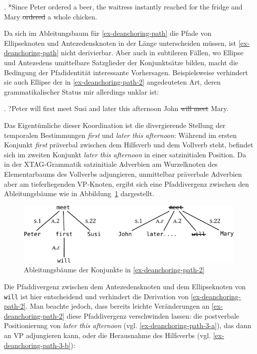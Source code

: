\ex. *Since Peter ordered a beer, the waitress instantly reached for the fridge and Mary \sout{ordered} a whole chicken. \hfill \citep[(10)]{Lichte:Kallmeyer:10}\label{ex-deanchoring-path}

Da sich im Ableitungsbaum für \ref{ex-deanchoring-path} die Pfade von Ellipseknoten und Antezedensknoten in der Länge  unterscheiden müssen, ist \ref{ex-deanchoring-path} nicht derivierbar. Aber auch in subtileren Fällen, wo Ellipse und Antezedens umittelbare Satzglieder der Konjunktsätze bilden, macht die Bedingung der Pfadidentität interessante Vorhersagen. Beispielsweise verhindert sie auch Ellipse der in \ref{ex-deanchoring-path-2} angedeuteten Art, deren grammatikalischer Status mir allerdings unklar ist:

\ex. \label{ex-deanchoring-path-2} 
?Peter will first meet Susi and later this afternoon John \sout{will meet} Mary.

Das Eigentümliche dieser Koordination ist die divergierende Stellung der temporalen Bestimmungen {\it first} und {\it later this afternoon}: Während im ersten Konjunkt {\it first} präverbal zwischen dem Hilfsverb und dem Vollverb steht, befindet sich im zweiten Konjunkt {\it later this afternoon} in einer satzinitialen Position. Da in der XTAG-Grammatik satzinitiale Adverbien am Wurzelknoten des Elementarbaums des Vollverbs adjungieren, unmittelbar präverbale Adverbien aber am tieferliegenden VP-Knoten, ergibt sich eine Pfaddivergenz zwischen den Ableitungsbäume wie in Abbildung~\ref{fig-deanchoring-path} dargestellt. 
\begin{figure}[t]
\centering
\includegraphics{graphics/abb823.pdf}
\caption{\label{fig-deanchoring-path}Ableitungsbäume der Konjunkte in \ref{ex-deanchoring-path-2}}
\end{figure}
Die Pfaddivergenz zwischen dem Antezedensknoten und dem Ellipseknoten von {\tt will} ist hier entscheidend und verhindert  die Derivation von \ref{ex-deanchoring-path-2}. Man beachte jedoch, dass bereits leichte Veränderungen an \ref{ex-deanchoring-path-2} diese Pfaddivergenz verschwinden lassen: die postverbale Positionierung von {\it later this afternoon} (vgl. \ref{ex-deanchoring-path-3-a}), das dann an VP adjungieren kann, oder die Herausnahme des Hilfsverbs (vgl. \ref{ex-deanchoring-path-3-b}): 

